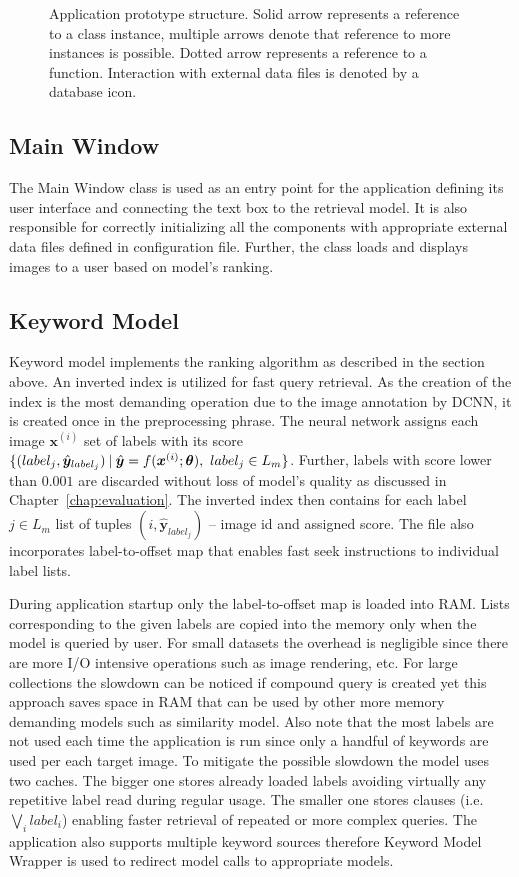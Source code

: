 \begin{figure}[h]
	\centering
	
	
	\caption[Application prototype structure]{Application prototype structure. Solid arrow represents a reference to a class instance, multiple arrows denote that reference to more instances is possible. Dotted arrow represents a reference to a function. Interaction with external data files is denoted by a database icon.}
	\label{fig:wpf_app}
\end{figure}

\subsection{Main Window}
The Main Window class is used as an entry point for the application defining its user interface and connecting the text box to the retrieval model. It is also responsible for correctly initializing all the components with appropriate external data files defined in configuration file. Further, the class loads and displays images to a user based on model's ranking.


\subsection{Keyword Model}
Keyword model implements the ranking algorithm as described in the section above. An inverted index is utilized for fast query retrieval. As the creation of the index is the most demanding operation due to the image annotation by DCNN, it is created once in the preprocessing phrase. The neural network assigns each image $\bm{x}^{(i)}$ set of labels with its score $\{(label_j,\hat{\bm{y}}_{label_j})\:\vert\:{\hat{\bm{y}}=f(\bm{x}^{(i)};\bm{\theta})},\  {label_j\in L_m}\}$. Further, labels with score lower than $0.001$ are discarded without loss of model's quality as discussed in Chapter~\ref{chap:evaluation}. The inverted index then contains for each label $j\in L_m$ list of tuples $(i, \hat{\bm{y}}_{label_j})$ -- image id and assigned score. The file also incorporates label-to-offset map that enables fast seek instructions to individual label lists.

During application startup only the label-to-offset map is loaded into RAM. Lists corresponding to the given labels are copied into the memory only when the model is queried by user. For small datasets the overhead is negligible since there are more I/O intensive operations such as image rendering, etc. For large collections the slowdown can be noticed if compound query is created yet this approach saves space in RAM that can be used by other more memory demanding models such as similarity model. Also note that the most labels are not used each time the application is run since only a handful of keywords are used per each target image. To mitigate the possible slowdown the model uses two caches. The bigger one stores already loaded labels avoiding virtually any repetitive label read during regular usage. The smaller one stores clauses (i.e. $\bigvee_i label_i$) enabling faster retrieval of repeated or more complex queries. The application also supports multiple keyword sources therefore Keyword Model Wrapper is used to redirect model calls to appropriate models.

